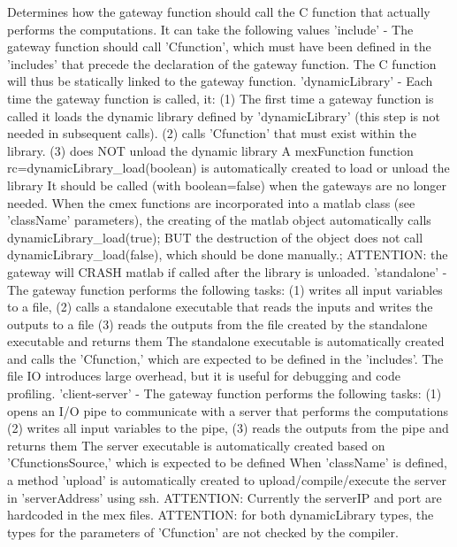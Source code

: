 \begin{itemize}
   Determines how the gateway function should call the C function that   
actually performs the computations. It can take the following values   
'include' - The gateway function should call 'Cfunction',   
              which must have been defined in the 'includes'   
              that precede the declaration of the gateway function.   
              The C function will thus be statically linked to the   
              gateway function.   
'dynamicLibrary' - Each time the gateway function is called, it:   
              (1) The first time a gateway function is called it   
                  loads the dynamic library defined by 'dynamicLibrary'   
                  (this step is not needed in subsequent calls).   
              (2) calls 'Cfunction' that must exist within the library.   
              (3) does NOT unload the dynamic library   
              A mexFunction   
                 function rc=dynamicLibrary\_load(boolean)   
              is automatically created to load or unload the library   
              It should be called (with boolean=false)   
              when the gateways are no longer needed.   
              When the cmex functions are incorporated into a matlab class   
              (see 'className' parameters), the creating of the matlab   
              object automatically calls dynamicLibrary\_load(true);   
              BUT the destruction of the object does not call   
              dynamicLibrary\_load(false), which should be done manually.;   
              ATTENTION: the gateway will CRASH matlab if called after   
              the library is unloaded.   
'standalone' - The gateway function performs the following tasks:   
              (1) writes all input variables to a file,   
              (2) calls a standalone executable that reads the inputs   
                  and writes the outputs to a file   
              (3) reads the outputs from the file created by the   
                  standalone executable and returns them   
              The standalone executable is automatically created   
              and calls the 'Cfunction,' which are expected to be defined   
              in the 'includes'.   
              The file IO introduces large overhead, but it is useful for   
              debugging and code profiling.   
'client-server' - The gateway function performs the following tasks:   
              (1) opens an I/O pipe to communicate with a server that   
                  performs the computations   
              (2) writes all input variables to the pipe,   
              (3) reads the outputs from the pipe and returns them   
              The server executable is automatically created   
              based on 'CfunctionsSource,' which is expected to be defined   
              When 'className' is defined, a method 'upload' is   
              automatically created to upload/compile/execute the server   
              in 'serverAddress' using ssh.   
              ATTENTION: Currently the serverIP and port are hardcoded   
                         in the mex files.   
ATTENTION: for both dynamicLibrary types, the types for the parameters   
           of 'Cfunction' are not checked by the compiler.


\end{itemize}
